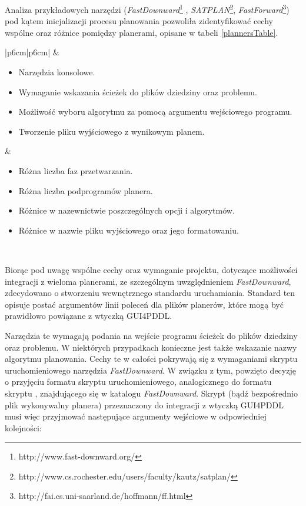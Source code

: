 Analiza przykładowych narzędzi (\emph{FastDownward}\footnote{http://www.fast-downward.org/} , \emph{SATPLAN}\footnote{http://www.cs.rochester.edu/users/faculty/kautz/satplan/}, \emph{FastForward}\footnote{http://fai.cs.uni-saarland.de/hoffmann/ff.html}) pod kątem inicjalizacji procesu planowania pozwoliła zidentyfikować cechy wspólne oraz różnice pomiędzy planerami, opisane w tabeli \ref{plannersTable}.
\begin{table}[h]
\centering
\caption{Cechy wspólne oraz różnice w uruchamianiu pomiędzy przykładowymi planerami.}
\label{plannersTable}
\begin{tabular}{|p{6cm}|p{6cm}|}
\hline
{} 
    &  
   \\
   \hline
\begin{itemize}
\item Narzędzia konsolowe.
\item Wymaganie wskazania ścieżek do plików dziedziny oraz problemu.
\item Możliwość wyboru algorytmu za pomocą argumentu wejściowego programu.
\item Tworzenie pliku wyjściowego z wynikowym planem.
\end{itemize}
&
\begin{itemize}
\item Różna liczba faz przetwarzania.
\item Różna liczba podprogramów planera.
\item Różnice w nazewnictwie poszczególnych opcji i algorytmów.
\item Różnice w nazwie pliku wyjściowego oraz jego formatowaniu.
\end{itemize} \\
\hline
\end{tabular}
\end{table}

Biorąc pod uwagę wspólne cechy  oraz wymaganie projektu, dotyczące możliwości integracji z wieloma planerami, ze szczególnym uwzględnieniem \emph{FastDownward}, zdecydowano o stworzeniu wewnętrznego standardu uruchamiania. Standard ten opisuje postać argumentów linii poleceń dla plików planerów, które mogą być prawidłowo powiązane z wtyczką GUI4PDDL. 

Narzędzia te wymagają podania na wejście programu ścieżek do plików dziedziny oraz problemu. W niektórych przypadkach konieczne jest także wskazanie nazwy algorytmu planowania. Cechy te w całości pokrywają się z wymaganiami skryptu uruchomieniowego narzędzia \emph{FastDownward}. W związku z tym, powzięto decyzję o przyjęciu formatu skryptu uruchomieniowego, analogicznego do formatu skryptu , znajdującego się w katalogu  \emph{FastDownward}. Skrypt (bądź bezpośrednio plik wykonywalny planera) przeznaczony do integracji z wtyczką GUI4PDDL musi więc przyjmować następujące argumenty wejściowe w odpowiedniej kolejności:

